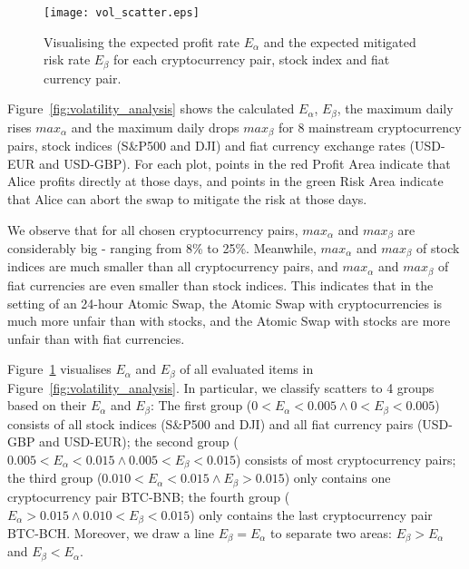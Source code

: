 \begin{figure}[htp]
    \texttt{[image: vol\_scatter.eps]}
    \caption{Visualising the expected profit rate $E_\alpha$ and the expected mitigated risk rate $E_\beta$ for each cryptocurrency pair, stock index and fiat currency pair.}
    \label{fig:vol_scatter}
\end{figure}

Figure~\ref{fig:volatility_analysis} shows the calculated $E_\alpha$, $E_\beta$, the maximum daily rises $max_\alpha$ and the maximum daily drops $max_\beta$ for 8 mainstream cryptocurrency pairs, stock indices (S\&P500 and DJI) and fiat currency exchange rates (USD-EUR and USD-GBP).
For each plot, points in the red Profit Area indicate that Alice profits directly at those days, and points in the green Risk Area indicate that Alice can abort the swap to mitigate the risk at those days.

We observe that for all chosen cryptocurrency pairs, $max_\alpha$ and $max_\beta$ are considerably big - ranging from 8\% to 25\%.
Meanwhile, $max_\alpha$ and $max_\beta$ of stock indices are much smaller than all cryptocurrency pairs,
and $max_\alpha$ and $max_\beta$ of fiat currencies are even smaller than stock indices.
This indicates that in the setting of an 24-hour Atomic Swap, the Atomic Swap with cryptocurrencies is much more unfair than with stocks, and the Atomic Swap with stocks are more unfair than with fiat currencies.


Figure~\ref{fig:vol_scatter} visualises $E_\alpha$ and $E_\beta$ of all evaluated items in Figure~\ref{fig:volatility_analysis}.
In particular, we classify scatters to 4 groups based on their $E_\alpha$ and $E_\beta$:
The first group ($ 0 < E_\alpha < 0.005 \wedge 0 < E_\beta < 0.005$) consists of all stock indices (S\&P500 and DJI) and all fiat currency pairs (USD-GBP and USD-EUR);
the second group ($0.005 < E_\alpha < 0.015 \wedge 0.005 < E_\beta < 0.015$) consists of most cryptocurrency pairs;
the third group ($0.010 < E_\alpha < 0.015 \wedge E_\beta > 0.015$) only contains one cryptocurrency pair BTC-BNB;
the fourth group ($E_\alpha > 0.015 \wedge 0.010 < E_\beta < 0.015$) only contains the last cryptocurrency pair BTC-BCH.
Moreover, we draw a line $E_\beta = E_\alpha$ to separate two areas: $E_\beta > E_\alpha$ and $E_\beta < E_\alpha$.

